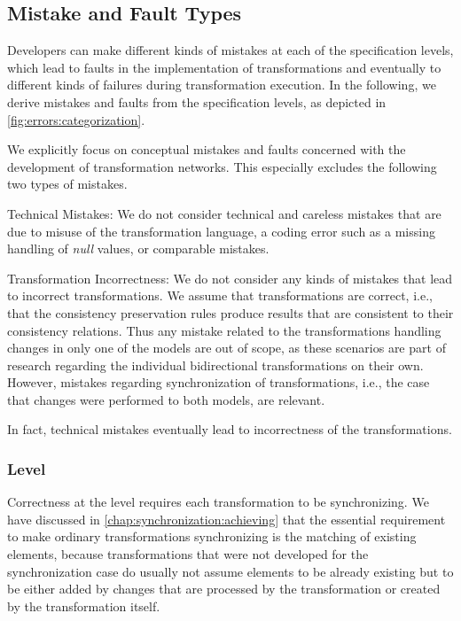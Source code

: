 \subsection{Mistake and Fault Types}
\label{chap:errors:categorization:mistakes}

Developers can make different kinds of mistakes at each of the specification levels, which lead to faults in the implementation of transformations and eventually to different kinds of failures during transformation execution.
In the following, we derive mistakes and faults from the specification levels, as depicted in \autoref{fig:errors:categorization}.

We explicitly focus on conceptual mistakes and faults concerned with the development of transformation networks.
This especially excludes the following two types of mistakes.
\begin{properdescription}
    \item[Technical Mistakes:] We do not consider technical and careless mistakes that are due to misuse of the transformation language, a coding error such as a missing handling of \emph{null} values, or comparable mistakes.
    \item[Transformation Incorrectness:] We do not consider any kinds of mistakes that lead to incorrect transformations. We assume that transformations are correct, i.e., that the consistency preservation rules produce results that are consistent to their consistency relations. Thus any mistake related to the transformations handling changes in only one of the models are out of scope, as these scenarios are part of research regarding the individual bidirectional transformations on their own. However, mistakes regarding synchronization of transformations, i.e., the case that changes were performed to both models, are relevant.
\end{properdescription}
In fact, technical mistakes eventually lead to incorrectness of the transformations.


\subsubsection*{\LevelTransformation Level}

Correctness at the \leveltransformation level requires each transformation to be synchronizing.
We have discussed in \autoref{chap:synchronization:achieving} that the essential requirement to make ordinary transformations synchronizing is the matching of existing elements, because transformations that were not developed for the synchronization case do usually not assume elements to be already existing but to be either added by changes that are processed by the transformation or created by the transformation itself.

